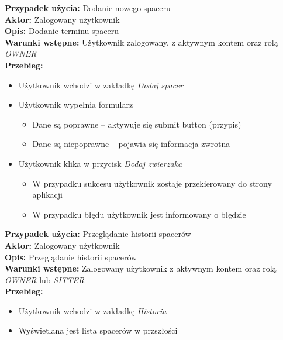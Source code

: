 \noindent
\textbf{Przypadek użycia:} Dodanie nowego spaceru\\
\textbf{Aktor:} Zalogowany użytkownik\\
\textbf{Opis:} Dodanie terminu spaceru\\
\textbf{Warunki wstępne:} Użytkownik zalogowany, z aktywnym kontem oraz rolą \textit{OWNER}\\
\textbf{Przebieg:}
\begin{itemize}
    \item Użytkownik wchodzi w zakładkę \textit{Dodaj spacer}
    \item Użytkownik wypełnia formularz
    \begin{itemize}
        \item Dane są poprawne -- aktywuje się submit button (przypis)
        \item Dane są niepoprawne -- pojawia się informacja zwrotna
    \end{itemize}
    \item Użytkownik klika w przycisk \textit{Dodaj zwierzaka}
    \begin{itemize}
        \item W przypadku sukcesu użytkownik zostaje przekierowany do strony aplikacji
        \item W przypadku błędu użytkownik jest informowany o błędzie
    \end{itemize}
\end{itemize}

\noindent
\textbf{Przypadek użycia:} Przeglądanie historii spacerów\\
\textbf{Aktor:} Zalogowany użytkownik\\
\textbf{Opis:} Przeglądanie historii spacerów\\
\textbf{Warunki wstępne:} Zalogowany użytkownik z aktywnym kontem oraz rolą \textit{OWNER} lub \textit{SITTER}\\
\textbf{Przebieg:}
\begin{itemize}
    \item Użytkownik wchodzi w zakładkę \textit{Historia}
    \item Wyświetlana jest lista spacerów w przszłości
\end{itemize}

